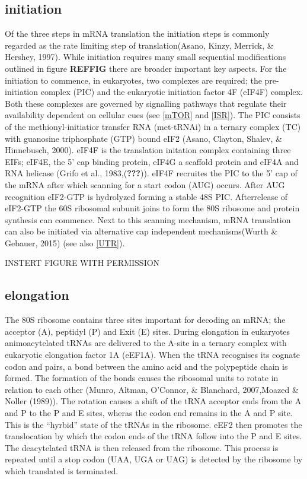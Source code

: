 \documentclass[12pt,openany]{book}
\begin{document}
\clearpage

\subsection{initiation}

Of the three steps in mRNA translation the initiation steps is commonly
regarded as the rate limiting step of translation(Asano, Kinzy, Merrick,
\& Hershey, 1997). While initiation requires many small sequential
modifications outlined in figure \textbf{REFFIG} there are broader
important key aspects. For the initiation to commence, in eukaryotes,
two complexes are required; the pre-initiation complex (PIC) and the
eukaryotic initiation factor 4F (eIF4F) complex. Both these complexes
are governed by signalling pathways that regulate their availability
dependent on cellular cues (see \ref{mTOR} and \ref{ISR}). The PIC
consists of the methionyl-initiatior transfer RNA (met-tRNAi) in a
ternary complex (TC) with guanosine triphosphate (GTP) bound eIF2
(Asano, Clayton, Shalev, \& Hinnebusch, 2000). eIF4F is the translation
initation complex containing three EIFs; eIF4E, the 5' cap binding
protein, eIF4G a scaffold protein and eIF4A and RNA helicase (Grifo et
al., 1983,({\textbf{???}})). eIF4F recruites the PIC to the 5' cap of
the mRNA after which scanning for a start codon (AUG) occurs. After AUG
recognition eIF2-GTP is hydrolyzed forming a stable 48S PIC.
Afterrelease of eIF2-GTP the 60S ribosomal subunit joins to form the 80S
ribosome and protein synthesis can commence. Next to this scanning
mechanism, mRNA translation can also be initiated via alternative cap
independent mechanisms(Wurth \& Gebauer, 2015) (see also \ref{UTR}).

INSTERT FIGURE WITH PERMISSION

\subsection{elongation}

The 80S ribosome contains three sites important for decoding an mRNA;
the acceptor (A), peptidyl (P) and Exit (E) sites. During elongation in
eukaryotes animoacytelated tRNAs are delivered to the A-site in a
ternary complex with eukaryotic elongation factor 1A (eEF1A). When the
tRNA recognises its cognate codon and pairs, a bond between the amino
acid and the polypeptide chain is formed. The formation of the bonds
causes the ribosomal units to rotate in relation to each other (Munro,
Altman, O'Connor, \& Blanchard, 2007,Moazed \& Noller (1989)). The
rotation causes a shift of the tRNA acceptor ends from the A and P to
the P and E sites, wheras the codon end remains in the A and P site.
This is the ``hyrbid'' state of the tRNAs in the ribosome. eEF2 then
promotes the translocation by which the codon ends of the tRNA follow
into the P and E sites. The deacytelated tRNA is then released from the
ribosome. This process is repeated until a stop codon (UAA, UGA or UAG)
is detected by the ribosome by which translated is terminated.
\end{document}
